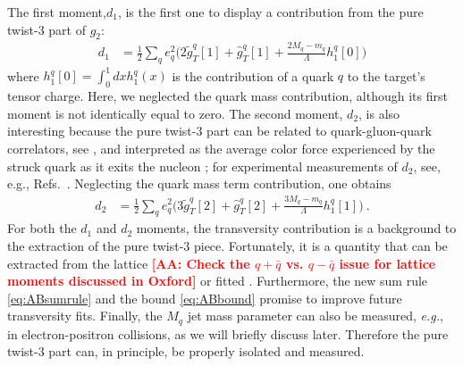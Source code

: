 \documentclass[preprintnumbers,floatfix,nofootinbib]{revtex4}
\def\AAcom#1{{\bf  \textcolor{Red}{[AA: {#1}]}}}
\newcommand{\eg}{{\em e.g.}}
\newcommand{\mj}{M_q}
\newcommand{\mq}{m_q}
\begin{document}
The first moment,$d_1$, is the first one to display a contribution from the pure twist-3 part of $g_2$:
\begin{align}
  d_1 & = \frac12 \sum_q e_q^2 \bigg( 2 \tilde g_T^q[1] + \hat g_T^q[1]
    + \frac{2\mj-\mq}{\Lambda} h_1^q[0] \bigg)
\label{e:d1}
\end{align}
where $h_1^q[0] = \int_0^1 dx h_1^q(x)$ is the contribution of a quark $q$ to the target's tensor charge. Here, we neglected the quark mass contribution, although its first moment is not identically equal to zero. The second moment, $d_2$, is also interesting because the pure twist-3 part can be related to quark-gluon-quark correlators, see \cite{Jaffe:1996zw}, and
interpreted as the average color force experienced by the struck quark as
it exits the nucleon \cite{Burkardt:2012sd}; for experimental
measurements of $d_2$, see, e.g., Refs.~\cite{Anthony:2002hy,Slifer:2008xu,Solvignon:2013yun,Posik:2014usi,Flay:2016wie}. Neglecting the quark mass term contribution, one obtains
\begin{align}
  d_2 & = \frac12 \sum_q e_q^2 \bigg( 3 \tilde g_T^q[2] + \hat g_T^q[2]
    + \frac{3\mj-\mq}{\Lambda} h_1^q[1] \bigg) \ .
\end{align}
For both the $d_1$ and $d_2$ moments, the transversity contribution is a background to the extraction of the pure twist-3 piece. Fortunately, it is a quantity that can be extracted from the lattice
\cite{Green:2012ej,Bali:2014nma,Bhattacharya:2015wna,Abdel-Rehim:2015owa,Bhattacharya:2016zcn} 
\AAcom{Check the $q+\bar q$ vs. $q-\bar q$ issue for lattice moments discussed in Oxford}
or fitted \cite{Radici:2015mwa,Anselmino:2015sxa,Kang:2015msa}.
Furthermore, the new sum rule \eqref{eq:ABsumrule} and the bound
\eqref{eq:ABbound} promise to improve future transversity fits. Finally, the $\mj$ jet mass parameter can
also be measured, \eg, in electron-positron collisions, as we will briefly discuss later. Therefore the pure twist-3 part can, in principle, be properly isolated and measured.
\end{document}
